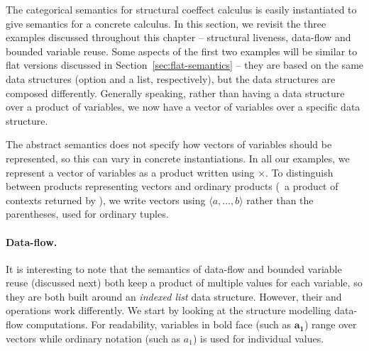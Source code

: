 The categorical semantics for structural coeffect calculus is easily instantiated to give
semantics for a concrete calculus. In this section, we revisit the three examples discussed
throughout this chapter -- structural liveness, data-flow and bounded variable reuse. 
Some aspects of the first two examples will be similar to flat versions discussed in
Section~\ref{sec:flat-semantics} -- they are based on the same data structures (option and a 
list, respectively), but the data structures are composed differently. Generally speaking,
rather than having a data structure over a product of variables, we now have 
a vector of variables over a specific data structure.

The abstract semantics does not specify how vectors of variables should be represented, so this can
vary in concrete instantiations. In all our examples, we represent a vector of variables as a 
product written using $\times$. To distinguish between products representing vectors and ordinary
products (\eg~a product of contexts returned by ), we write vectors using 
$\langle a, \ldots, b \rangle$ rather than the parentheses, used for ordinary tuples.

\paragraph{Data-flow.}
It is interesting to note that the semantics of data-flow and bounded variable reuse (discussed
next) both keep a product of multiple values for each variable, so they are both built around an 
\emph{indexed list} data structure. However, their  and  operations work 
differently. We start by looking at the structure modelling data-flow computations. For readability,
variables in bold face (such as $\mathbf{a_1}$) range over vectors while ordinary notation (such
as $a_1$) is used for individual values.

~

~

